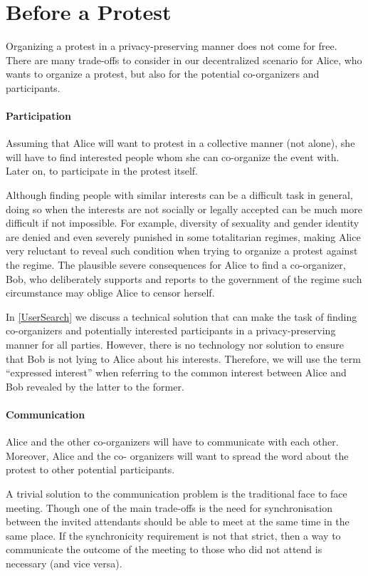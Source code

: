 \section{Before a Protest}
\label{BeforeProtest}
Organizing a protest in a privacy-preserving manner does not come for free. There 
are many trade-offs to consider in our decentralized scenario for Alice, who wants 
to organize a protest, but also for the potential co-organizers and participants.

\paragraph{Participation}
Assuming that Alice will want to protest in a collective manner (not alone), she 
will have to find interested people whom she can co-organize the event with. Later 
on, to participate in the protest itself.

Although finding people with similar interests can be a difficult task in general, 
doing so when the interests are not socially or legally accepted can be much more 
difficult if not impossible. For example, diversity of sexuality and gender identity 
are denied and even severely punished in some totalitarian regimes, making Alice 
very reluctant to reveal such condition when trying to organize a protest against 
the regime. The plausible severe consequences for Alice to find a co-organizer, 
Bob, who deliberately supports and reports to the government of the regime such 
circumstance may oblige Alice to censor herself. 

In \cref{UserSearch} we discuss a technical solution that can make the task of finding
co-organizers and potentially interested participants in a privacy-preserving manner 
for all parties. However, there is no technology nor solution to ensure that Bob 
is not lying to Alice about his interests. Therefore, we will use the term \enquote{expressed 
interest} when referring to the common interest between Alice and Bob revealed by 
the latter to the former. 

\paragraph{Communication}
Alice and the other co-organizers will have to communicate with each other. Moreover, 
Alice and the co- organizers will want to spread the word about the protest to other 
potential participants.

A trivial solution to the communication problem is the traditional face to face 
meeting. Though one of the main trade-offs is the need for synchronisation between 
the invited attendants should be able to meet at the same time in the same place. 
If the synchronicity requirement is not that strict, then a way to communicate the 
outcome of the meeting to those who did not attend is necessary (and vice versa).

